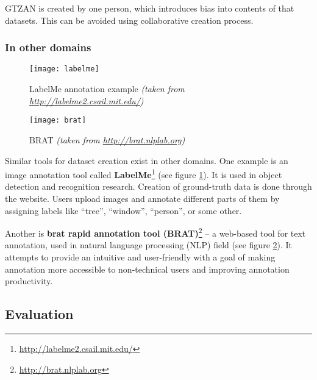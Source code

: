 GTZAN is created by one person, which introduces bias into contents of that datasets. This can be avoided using collaborative creation process.

\subsubsection{In other domains}

\begin{figure}[!htb]
  \centering
  \texttt{[image: labelme]}
    \caption{LabelMe annotation example \textit{(taken from \url{http://labelme2.csail.mit.edu/})}}
    \label{fig:labelme}
\end{figure}

\begin{figure}[!htb]
  \centering
  \texttt{[image: brat]}
    \caption{BRAT \textit{(taken from \url{http://brat.nlplab.org})}}
    \label{fig:brat}
\end{figure}

Similar tools for dataset creation exist in other domains. One example is an image annotation tool called \textbf{LabelMe}\footnote{\url{http://labelme2.csail.mit.edu/}} \cite{labelme} (see figure \ref{fig:labelme}). It is used in object detection and recognition research. Creation of ground-truth data is done through the website. Users upload images and annotate different parts of them by assigning labels like ``tree'', ``window'', ``person'', or some other.

Another is \textbf{brat rapid annotation tool (BRAT)}\footnote{\url{http://brat.nlplab.org}} -- a web-based tool for text annotation, used in natural language processing (NLP) field \cite{brat} (see figure \ref{fig:brat}). It attempts to provide an intuitive and user-friendly with a goal of making annotation more accessible to non-technical users and improving annotation productivity.

\subsection{Evaluation}

